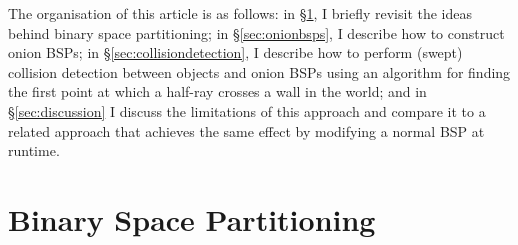 \documentclass[10pt,twocolumn]{article}
\begin{document}
The organisation of this article is as follows: in \S\ref{sec:bsps}, I briefly revisit the ideas behind binary space partitioning; in \S\ref{sec:onionbsps}, I describe how to construct onion BSPs; in \S\ref{sec:collisiondetection}, I describe how to perform (swept) collision detection between objects and onion BSPs using an algorithm for finding the first point at which a half-ray crosses a wall in the world; and in \S\ref{sec:discussion} I discuss the limitations of this approach and compare it to a related approach that achieves the same effect by modifying a normal BSP at runtime.

\section{Binary Space Partitioning}
\label{sec:bsps}
\end{document}
